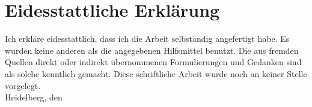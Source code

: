
\chapter*{Eidesstattliche Erklärung}
Ich erkläre eidesstattlich, dass ich die Arbeit selbständig angefertigt habe. Es wurden keine anderen als die angegebenen Hilfsmittel benutzt. Die aus fremden Quellen direkt oder indirekt übernommenen Formulierungen und Gedanken sind als solche kenntlich gemacht. Diese schriftliche Arbeit wurde noch an keiner Stelle vorgelegt.\\[2cm]

{\sffamily Heidelberg, den} \makebox[7cm]{\hrulefill}\\
\-\hspace{6cm}{\sffamily Jasper Seehofer}
